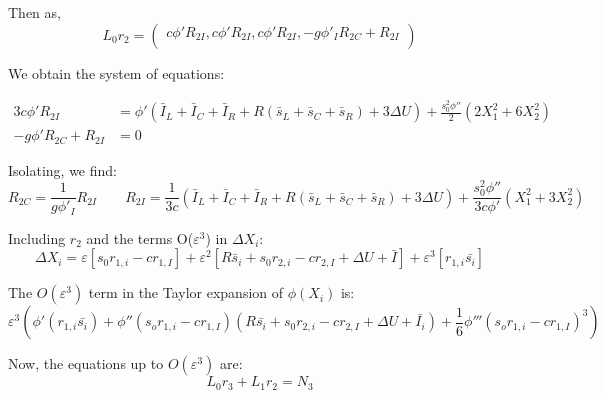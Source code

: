 \documentclass[ENG]{fancynotes}
\begin{document}
Then as, \[L_0r_2 = \begin{pmatrix}
c\phi'R_{2I},c\phi'R_{2I},c\phi'R_{2I}, -g\phi'_IR_{2C} +R_{2I}\\
\end{pmatrix}\]

We obtain the system of equations:
%

\begin{equation}
\begin{aligned}
3c\phi'R_{2I}  &= \phi'(\bar{I}_L+\bar{I}_C+\bar{I}_R + R(\bar{s}_L+ \bar{s}_C+ \bar{s}_R) +3\Delta U )+ \frac{s_0^2\phi''}{2}\left(2X_1^2+6X_2^2 \right)\\[8pt]
-g\phi'R_{2C} +R_{2I} &= 0
\end{aligned}
\label{eq:}
\end{equation}


Isolating, we find:
\[
R_{2C} = \frac{1}{g\phi'_I}R_{2I} \qquad R_{2I} = \frac{1}{3c}(\bar{I}_L+\bar{I}_C+\bar{I}_R + R(\bar{s}_L+ \bar{s}_C+ \bar{s}_R) +3\Delta U )+ \frac{s_0^2\phi''}{3c\phi'}(X_1^2+3X_2^2)
\]

Including $r_2$ and the terms O($\varepsilon^3$) in $\Delta X_i$:
\begin{equation}
\Delta X_i = \varepsilon [s_0 r_{1,i}- cr_{1,I}] + \varepsilon^2[R\bar{s}_i + s_0r_{2,i} - c r_{2,I}+ \Delta U + \bar{I}] + \varepsilon^3 [r_{1,i}\bar{s_i} ]
\end{equation}

The $O(\varepsilon^3)$ term in the Taylor expansion of $\phi(X_i)$ is:
\begin{equation}
\varepsilon^3\left(\phi'(r_{1,i}\bar{s_i}) +\phi''(s_o r_{1,i}-cr_{1,I})(R\bar{s_i}+ s_0r_{2,i} - c r_{2,I}+ \Delta U + \bar{I_i}) + \frac{1}{6} \phi'''(s_o r_{1,i}-cr_{1,I})^3  \right) 
\end{equation}

Now, the equations up to $O(\varepsilon^3)$ are:
\[
L_0r_3 + L _{1} r_{2} = N _{3}
\]
\end{document}
